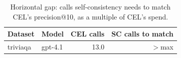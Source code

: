 \begin{table}[t]
\centering
\small
\begin{tabular}{llrr}
\toprule
Dataset & Model & CEL calls & SC calls to match \\
\midrule
triviaqa & gpt-4.1 & 13.0 & $>$max \\
\bottomrule
\end{tabular}
\caption{Horizontal gap: calls self-consistency needs to match CEL's precision@10, as a multiple of CEL's spend.}
\label{tab:hgap}
\end{table}
